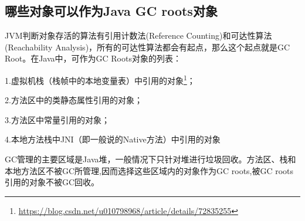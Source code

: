 \documentclass[../../../interview-questions.tex]{subfiles}
\begin{document}
\subsection{哪些对象可以作为Java GC roots对象}

JVM判断对象存活的算法有引用计数法(Reference Counting)和可达性算法(Reachability Analysis)，所有的可达性算法都会有起点，那么这个起点就是GC Root。在Java中，可作为GC Roots对象的列表：

1.虚拟机栈（栈帧中的本地变量表）中引用的对象\footnote{\url{https://blog.csdn.net/u010798968/article/details/72835255}}；

2.方法区中的类静态属性引用的对象；

3.方法区中常量引用的对象；

4.本地方法栈中JNI（即一般说的Native方法）中引用的对象

GC管理的主要区域是Java堆，一般情况下只针对堆进行垃圾回收。方法区、栈和本地方法区不被GC所管理,因而选择这些区域内的对象作为GC roots,被GC roots引用的对象不被GC回收。
\end{document}
